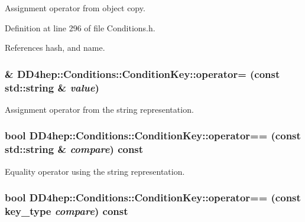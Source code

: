 Assignment operator from object copy. 

Definition at line 296 of file Conditions.h.

References hash, and name.\hypertarget{class_d_d4hep_1_1_conditions_1_1_condition_key_aa4ea8f008a5fe3ab0792c7dfeb826283}{
\subsubsection[{operator=}]{\& DD4hep::Conditions::ConditionKey::operator= (const std::string \& {\em value})}}
\label{class_d_d4hep_1_1_conditions_1_1_condition_key_aa4ea8f008a5fe3ab0792c7dfeb826283}


Assignment operator from the string representation. \hypertarget{class_d_d4hep_1_1_conditions_1_1_condition_key_a70be84b86389b63ca1d51c6a04baad82}{
\subsubsection[{operator==}]{\setlength{\rightskip}{0pt plus 5cm}bool DD4hep::Conditions::ConditionKey::operator== (const std::string \& {\em compare}) const}}
\label{class_d_d4hep_1_1_conditions_1_1_condition_key_a70be84b86389b63ca1d51c6a04baad82}


Equality operator using the string representation. \hypertarget{class_d_d4hep_1_1_conditions_1_1_condition_key_a469c6299819ff97644aba2c1e1ee3071}{
\subsubsection[{operator==}]{\setlength{\rightskip}{0pt plus 5cm}bool DD4hep::Conditions::ConditionKey::operator== (const {\bf key\_\-type} {\em compare}) const}}
\label{class_d_d4hep_1_1_conditions_1_1_condition_key_a469c6299819ff97644aba2c1e1ee3071}


